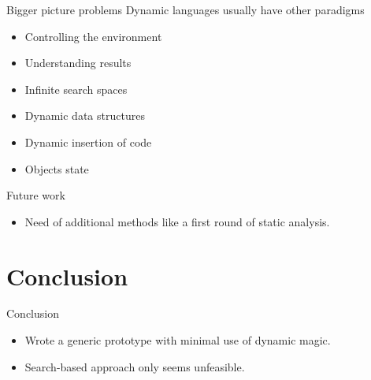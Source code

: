 \documentclass{beamer}
\begin{document}
\begin{frame}{Bigger picture problems}
  Dynamic languages usually have other paradigms

  \begin{itemize}
    \item Controlling the environment
    \item Understanding results
    \item Infinite search spaces
    \item Dynamic data structures
    \item Dynamic insertion of code
    \item Objects state
  \end{itemize}
\end{frame}

\begin{frame}{Future work}
  \begin{itemize}
    \item Need of additional methods like a first round of static analysis.
  \end{itemize}
\end{frame}


\section*{Conclusion}

\begin{frame}{Conclusion}
  \begin{itemize}
    \item Wrote a generic prototype with minimal use of dynamic magic.
  \end{itemize}
  \begin{itemize}
    \item Search-based approach only seems unfeasible.
  \end{itemize}
\end{frame}
\end{document}
